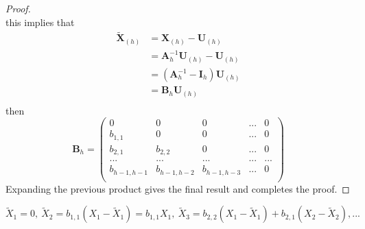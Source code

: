 \begin{proof}
\[    \]
    this implies that
    \begin{equation*}
        \begin{split}
            \tilde{\boldsymbol{X}}_{(h)}&=\boldsymbol{X}_{(h)}-\boldsymbol{U}_{(h)}\\
            &=\boldsymbol{A}_h^{-1}\boldsymbol{U}_{(h)}-\boldsymbol{U}_{(h)}\\
            &=\left(\boldsymbol{A}_h^{-1}-\boldsymbol{I}_h\right)\boldsymbol{U}_{(h)}\\
            &=\boldsymbol{B}_h\boldsymbol{U}_{(h)}\\
        \end{split}
    \end{equation*}
    then
    \[
        \boldsymbol{B}_h=
        \begin{pmatrix}
            0&0&0&...&0\\
            b_{1,1}&0&0&...&0\\
            b_{2,1}&b_{2,2}&0&...&0\\
            ...&...&...&...&...\\
            b_{h-1,h-1}&b_{h-1,h-2}&b_{h-1,h-3}&...&0\\
        \end{pmatrix}
    \]
    Expanding the previous product gives the final result and completes the proof.
\end{proof}

\begin{example}
    $\tilde{X}_1=0,\ \tilde{X}_2=b_{1,1}(X_1-\tilde{X}_1)=b_{1,1}X_1,\ \tilde{X}_3=b_{2,2}(X_1-\tilde{X}_1)+b_{2,1}(X_2-\tilde{X}_2),...$
\end{example}

